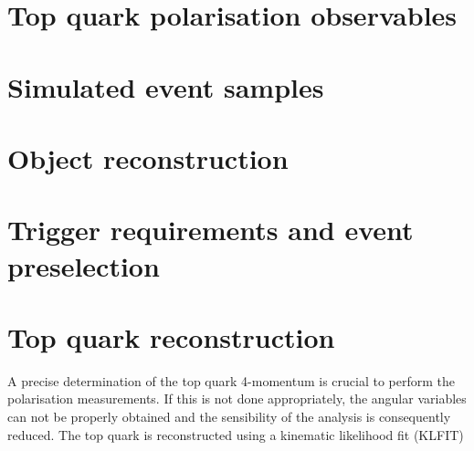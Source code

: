 \section{Top quark polarisation observables}
\label{chap:Polarisation:Observable}


\section{Simulated event samples}
\label{chap:Polarisation:MC}

\section{Object reconstruction}
\label{chap:Polarisation:Object}

\section{Trigger requirements and event preselection}
\label{chap:Polarisation:TriggerPR}


\section{Top quark reconstruction}
\label{chap:Polarisation:Topreco}
A precise determination of the top quark 4-momentum is crucial to perform the polarisation measurements.
If this is not done appropriately, the angular variables can not be properly obtained and the sensibility of
the analysis is consequently reduced.
The top quark is reconstructed using a kinematic likelihood fit (KLFIT) \cite{Erdmann_2014}


\begin{comment}






\end{comment}
